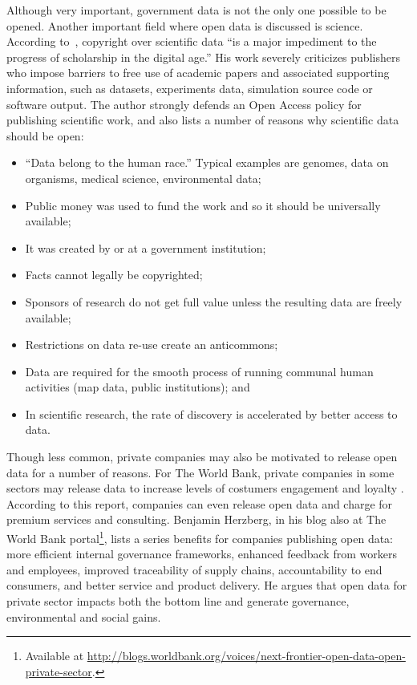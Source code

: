 Although very important, government data is not the only one possible to be opened.
Another important field where open data is discussed is science.
According to~, copyright over scientific data ``is a major impediment to the progress of scholarship in the digital age.''
His work severely criticizes publishers who impose barriers to free use of academic papers and associated supporting information, such as datasets, experiments data, simulation source code or software output.
The author strongly defends an Open Access policy for publishing scientific work, and also lists a number of reasons why scientific data should be open:

\begin{itemize}
	\item  ``Data belong to the human race.'' Typical examples are genomes, data on organisms, medical science, environmental data;
	\item Public money was used to fund the work and so it should be universally available;
	\item It was created by or at a government institution;
	\item Facts cannot legally be copyrighted;
	\item Sponsors of research do not get full value unless the resulting data are freely available;
	\item Restrictions on data re-use create an anticommons;
	\item Data are required for the smooth process of running communal human activities (map data, public institutions); and
	\item In scientific research, the rate of discovery is accelerated by better access to data.
\end{itemize}

Though less common, private companies may also be motivated to release open data for a number of reasons.
For The World Bank, private companies in some sectors may release data to increase levels of costumers engagement and loyalty \cite{TheWorldBank}.
According to this report, companies can even release open data and charge for premium services and consulting.
Benjamin Herzberg, in his blog also at The World Bank portal\footnote{Available at \url{http://blogs.worldbank.org/voices/next-frontier-open-data-open-private-sector}.}, lists a series benefits for companies publishing open data: more efficient internal governance frameworks, enhanced feedback from workers and employees, improved traceability of supply chains, accountability to end consumers, and better service and product delivery.
He argues that open data for private sector impacts both the bottom line and generate governance, environmental and social gains.

